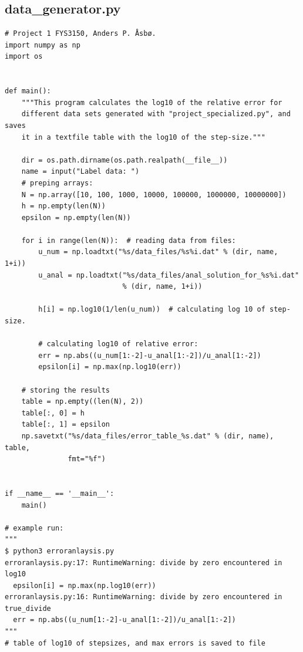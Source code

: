 \documentclass[english,notitlepage]{revtex4-1}  %
\begin{document}
\subsection{data\_generator.py} \label{A:3}
\begin{lstlisting}
# Project 1 FYS3150, Anders P. Åsbø.
import numpy as np
import os


def main():
    """This program calculates the log10 of the relative error for
    different data sets generated with "project_specialized.py", and saves
    it in a textfile table with the log10 of the step-size."""

    dir = os.path.dirname(os.path.realpath(__file__))
    name = input("Label data: ")
    # preping arrays:
    N = np.array([10, 100, 1000, 10000, 100000, 1000000, 10000000])
    h = np.empty(len(N))
    epsilon = np.empty(len(N))

    for i in range(len(N)):  # reading data from files:
        u_num = np.loadtxt("%s/data_files/%s%i.dat" % (dir, name, 1+i))
        u_anal = np.loadtxt("%s/data_files/anal_solution_for_%s%i.dat"
                            % (dir, name, 1+i))

        h[i] = np.log10(1/len(u_num))  # calculating log 10 of step-size.

        # calculating log10 of relative error:
        err = np.abs((u_num[1:-2]-u_anal[1:-2])/u_anal[1:-2])
        epsilon[i] = np.max(np.log10(err))

    # storing the results
    table = np.empty((len(N), 2))
    table[:, 0] = h
    table[:, 1] = epsilon
    np.savetxt("%s/data_files/error_table_%s.dat" % (dir, name), table,
               fmt="%f")


if __name__ == '__main__':
    main()

# example run:
"""
$ python3 erroranlaysis.py
erroranlaysis.py:17: RuntimeWarning: divide by zero encountered in log10
  epsilon[i] = np.max(np.log10(err))
erroranlaysis.py:16: RuntimeWarning: divide by zero encountered in true_divide
  err = np.abs((u_num[1:-2]-u_anal[1:-2])/u_anal[1:-2])
"""
# table of log10 of stepsizes, and max errors is saved to file

\end{lstlisting}
\end{document}
